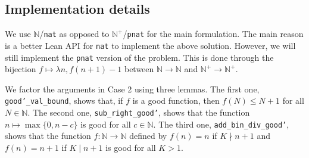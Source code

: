 \documentclass{article}
\newcommand{\N}{\mathbb{N}}
\begin{document}
\subsection*{Implementation details}

We use $\N$/\texttt{nat} as opposed to $\N^+$/\texttt{pnat} for the main formulation.
The main reason is a better Lean API for \texttt{nat} to implement the above solution.
However, we will still implement the \texttt{pnat} version of the problem.
This is done through the bijection $f \mapsto \lambda n, f(n + 1) - 1$ between $\N \to \N$ and $\N^+ \to \N^+$.

We factor the arguments in Case 2 using three lemmas.
The first one, \texttt{good'\_val\_bound}, shows that, if $f$ is a good function, then $f(N) \leq N + 1$ for all $N \in \N$.
The second one, \texttt{sub_right\_good'}, shows that the function $n \mapsto \max\{0, n - c\}$ is good for all $c \in \N$.
The third one, \texttt{add\_bin\_div\_good'}, shows that the function $f : \N \to \N$ defined by $f(n) = n$ if $K \nmid n + 1$ and $f(n) = n + 1$ if $K \mid n + 1$ is good for all $K > 1$.
\end{document}
